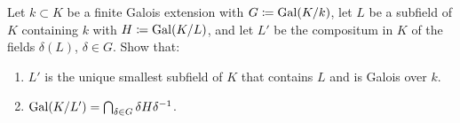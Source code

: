 \begin{problem}
  Let $k\subset K$ be a finite Galois extension with $G\coloneq\operatorname{Gal}(K/k)$,
  let $L$ be a subfield of $K$ containing $k$ with $H\coloneq\operatorname{Gal}(K/L)$,
  and let $L'$ be the compositum in $K$ of the fields $\delta(L)$,
  $\delta\in G$. Show that:
\begin{enumerate}[label=(\alph*),noitemsep]
\item $L'$ is the unique smallest subfield of $K$ that contains
  $L$ and is Galois over $k$.
\item $\operatorname{Gal}(K/L')=\bigcap_{\delta\in G}\delta H\delta^{-1}$.
\end{enumerate}
\end{problem}
\begin{solution}
\end{solution}

